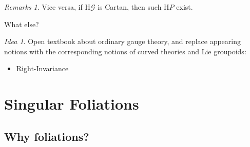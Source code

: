 \documentclass[
aspectratio=3218, 
10pt
]{beamer}
\theoremstyle{plain}
\theoremstyle{remark}
\newtheorem*{remark}{Remarks}
\newtheorem*{idea}{Idea}
\begin{document}
{\begin{frame}
\begin{remark}
Vice versa, if $\mathup{H}\mathcal{G}$ is Cartan, then such $\mathup{H}P$ exist.
\end{remark}
\end{frame}

\begin{frame}{What else?}
\begin{idea}
Open textbook about ordinary gauge theory, and replace appearing notions with the corresponding notions of curved theories and Lie groupoids:
\begin{itemize}
	\item Right-Invariance
\end{itemize}
\end{idea}
\end{frame}


\section{Singular Foliations}

\subsection{Why foliations?}
{
{

}}}
\end{document}

